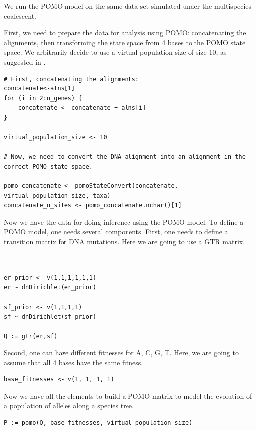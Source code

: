 \documentclass[11pt]{article}
\begin{document}
We run the POMO model on the same data set simulated under the multispecies coalescent.
 {\begin{framed}
 First, we need to prepare the data for analysis using POMO: concatenating the alignments, then transforming the state space from 4 bases to the POMO state space.
 We arbitrarily decide to use a virtual population size of size 10, as suggested in \citet{DeMaio2013}.
 {\tt \begin{snugshade*}
\begin{lstlisting}
# First, concatenating the alignments:
concatenate<-alns[1]
for (i in 2:n_genes) {
	concatenate <- concatenate + alns[i]
}

virtual_population_size <- 10

# Now, we need to convert the DNA alignment into an alignment in the correct POMO state space.

pomo_concatenate <- pomoStateConvert(concatenate, virtual_population_size, taxa)
concatenate_n_sites <- pomo_concatenate.nchar()[1]
\end{lstlisting}
\end{snugshade*}}
Now we have the data for doing inference using the POMO model.
To define a POMO model, one needs several components.
First, one needs to define a transition matrix for DNA mutations.
Here we are going to use a GTR matrix. 

 {\tt \begin{snugshade*}
\begin{lstlisting}


er_prior <- v(1,1,1,1,1,1)
er ~ dnDirichlet(er_prior)

sf_prior <- v(1,1,1,1)
sf ~ dnDirichlet(sf_prior)

Q := gtr(er,sf) 
\end{lstlisting}
\end{snugshade*}}

Second, one can have different fitnesses for A, C, G, T. 
Here, we are going to assume that all 4 bases have the same fitness.

 {\tt \begin{snugshade*}
\begin{lstlisting}
base_fitnesses <- v(1, 1, 1, 1)
\end{lstlisting}
\end{snugshade*}}
Now we have all the elements to build a POMO matrix to model the evolution of a population of alleles along a species tree.
 {\tt \begin{snugshade*}
\begin{lstlisting}
P := pomo(Q, base_fitnesses, virtual_population_size)
\end{lstlisting}
\end{snugshade*}}


\end{framed}}
\end{document}
